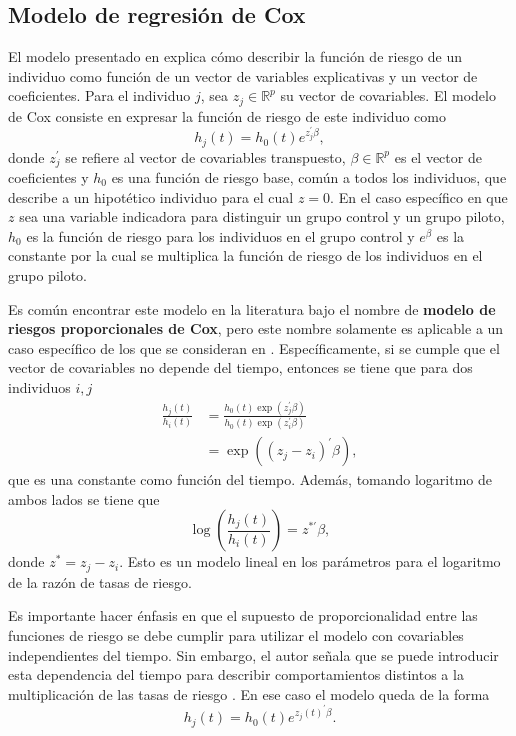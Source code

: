 \documentclass[11pt,a4paper]{article}
\begin{document}
\subsection{Modelo de regresión de Cox}
\label{seccion_coxph}
El modelo presentado en \citet{cox} explica cómo describir la función de riesgo de un individuo como función de un vector de variables explicativas y un vector de coeficientes. Para el individuo $j$, sea $z_j\in \mathbb{R}^p$ su vector de covariables. El modelo de Cox consiste en expresar la función de riesgo de este individuo como
\begin{equation} \label{cox_ph}
h_j(t) = h_0(t)e^{z_j^\prime \beta},
\end{equation}
donde $z_j^\prime$ se refiere al vector de covariables transpuesto, $\beta\in \mathbb{R}^p$ es el vector de coeficientes y $h_0$ es una función de riesgo base, común a todos los individuos, que describe a un hipotético individuo para el cual $z = 0$. En el caso específico en que $z$ sea una variable indicadora para distinguir un grupo control y un grupo piloto, $h_0$ es la función de riesgo para los individuos en el grupo control y $e^\beta$ es la constante por la cual se multiplica la función de riesgo de los individuos en el grupo piloto.

Es común encontrar este modelo en la literatura bajo el nombre de \textbf{modelo de riesgos proporcionales de Cox}, pero este nombre solamente es aplicable a un caso específico de los que se consideran en \citet{cox}. Específicamente, si se cumple que el vector de covariables no depende del tiempo, entonces se tiene que para dos individuos $i, j$
\begin{align}
\label{eq:prop_haz}
\frac{h_j(t)}{h_i(t)} &= \frac{h_0(t)\exp (z_j^\prime \beta)}{h_0(t)\exp (z_i^\prime \beta)} \nonumber \\
&= \exp ((z_j-z_i)^\prime \beta),
\end{align}
que es una constante como función del tiempo. Además, tomando logaritmo de ambos lados se tiene que
$$\log \left(\frac{h_j(t)}{h_i(t)}\right) = z^{*\prime} \beta,$$ donde $z^* = z_j-z_i$. Esto es un modelo lineal en los parámetros para el logaritmo de la razón de tasas de riesgo.

Es importante hacer énfasis en que el supuesto de proporcionalidad entre las funciones de riesgo se debe cumplir para utilizar el modelo con covariables independientes del tiempo. Sin embargo, el autor señala que se puede introducir esta dependencia del tiempo para describir comportamientos distintos a la multiplicación de las tasas de riesgo \citep{cox}. En ese caso el modelo queda de la forma
\begin{equation*}
h_j(t) = h_0(t)e^{z_j(t)^\prime \beta}.
\end{equation*}
\end{document}
